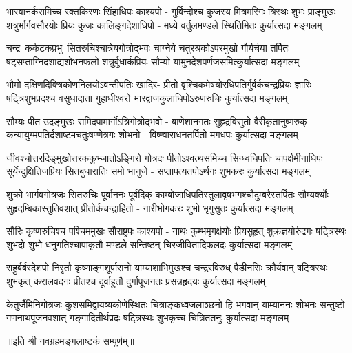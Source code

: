 
\fourlineindentedshloka
{भास्वानर्कसमिच्च रक्तकिरणः सिंहाधिपः काश्यपो -}
{गुर्विन्दोश्च कुजस्य मित्रमरिगः त्रिस्थः शुभः प्राङ्मुखः}
{शत्रुर्भार्गवसौरयोः प्रियः कुजः कालिङ्गदेशाधिपो -}
{मध्ये वर्तुलमण्डले स्थितिमितः कुर्यात्सदा मङ्गलम्}

\fourlineindentedshloka
{चन्द्रः कर्कटकप्रभुः सितरुचिश्चात्रेयगोत्रोद्भवः}
{चाग्नेये चतुरश्रकोऽपरमुखो गौर्यर्चया तर्पितः}
{षट्सप्ताग्निदशाद्यशोभनफलो शत्रुर्बुधार्कप्रियः}
{सौम्यो यामुनदेशपर्णजसमित्कुर्यात्सदा मङ्गलम्}

\fourlineindentedshloka
{भौमो दक्षिणदिक्त्रिकोणनिलयोऽवन्तीपतिः खादिर-}
{प्रीतो वृश्चिकमेषयोरधिपतिर्गुर्वर्कचन्द्रप्रियः}
{ज्ञारिः षट्त्रिशुभप्रदश्च वसुधादाता गुहाधीश्वरो}
{भारद्वाजकुलाधिपोऽरुणरुचिः कुर्यात्सदा मङ्गलम्}

\fourlineindentedshloka
{सौम्यः पीत उदङ्मुखः समिदपामार्गोऽत्रिगोत्रोद्भवो -}
{बाणेशानगतः सुहृद्रविसुतो वैरीकृतानुष्णरुक्}
{कन्यायुग्मपतिर्दशाष्टमचतुःषण्णेत्रगः शोभनो -}
{विष्ण्वाराधनतर्पितो मगधपः कुर्यात्सदा मङ्गलम्}

\fourlineindentedshloka
{जीवश्चोत्तरदिङ्मुखोत्तरककुभ्जातोऽङ्गिरो गोत्रदः}
{पीतोऽश्वत्थसमिच्च सिन्ध्वधिपतिः चापर्क्षमीनाधिपः}
{सूर्येन्दुक्षितिजप्रियः सितबुधारातिः समो भानुजे -}
{सप्तापत्यतपोऽर्थगः शुभकरः कुर्यात्सदा मङ्गलम्}

\fourlineindentedshloka
{शुक्रो भार्गवगोत्रजः सितरुचिः पूर्वाननः पूर्वदिक्}
{काम्बोजाधिपतिस्तुलावृषभगश्चौदुम्बरैस्तर्पितः}
{सौम्यर्क्योः सुहृदम्बिकास्तुतिवशात् प्रीतोर्कचन्द्राहितो -}
{नारीभोगकरः शुभो भृगुसुतः कुर्यात्सदा मङ्गलम्}

\fourlineindentedshloka
{सौरिः कृष्णरुचिश्च पश्चिममुखः सौराष्ट्रपः काश्यपो -}
{नाथः कुम्भमृगर्क्षयोः प्रियसुहृत् शुक्रज्ञयोर्रुद्रगः}
{षट्त्रिस्थः शुभदो शुभो  धनुगतिश्चापाकृतौ मण्डले}
{सन्तिष्ठन् चिरजीवितादिफलदः कुर्यात्सदा मङ्गलम्}

\fourlineindentedshloka
{राहुर्बर्बरदेशपो  निरृतौ कृष्णाङ्गशूर्पासनो}
{याम्याशाभिमुखश्च चन्द्ररविरुध् पैडीनसिः क्रौर्यवान्}
{षट्त्रिस्थः शुभकृत् करालवदनः प्रीतश्च दूर्वाहुतौ}
{दुर्गापूजनतः प्रसन्नहृदयः कुर्यात्सदा मङ्गलम्}

\fourlineindentedshloka
{केतुर्जैमिनिगोत्रजः कुशसमिद्वायव्यकोणेस्थितः}
{चित्राङ्कध्वजलाञ्छनो हि भगवान् याम्याननः शोभनः}
{सन्तुष्टो गणनाथपूजनवशात् गङ्गादितीर्थप्रदः}
{षट्त्रिस्थः शुभकृच्च चित्रिततनुः कुर्यात्सदा मङ्गलम्}

॥इति श्री नवग्रहमङ्गलाष्टकं सम्पूर्णम्॥